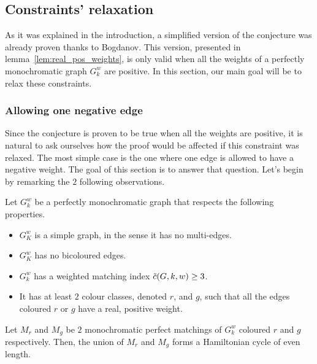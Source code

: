 \subsection{Constraints' relaxation}
\label{subsec:constraints_relaxation}

As it was explained in the introduction, a simplified version of the conjecture was already proven thanks to Bogdanov.\cite{bogdanov}
This version, presented in lemma~\ref{lem:real_pos_weights}, is only valid when all the weights of a perfectly monochromatic graph $G_k^w$ are positive.
In this section, our main goal will be to relax these constraints.

\subsubsection{Allowing one negative edge}
\label{subsubsec:one_negative_edge}

Since the conjecture is proven to be true when all the weights are positive, it is natural to ask ourselves how the proof would be affected if this constraint was relaxed.
The most simple case is the one where one edge is allowed to have a negative weight.
The goal of this section is to answer that question.
Let's begin by remarking the $2$ following observations.

\begin{observation}
    \label{obs:2_positive_classes_ham_cycle}
    Let $G_k^w$ be a perfectly monochromatic graph that respects the following properties.
    \begin{itemize}
        \item $G_K^w$ is a simple graph, in the sense it has no multi-edges.
        \item $G_K^w$ has no bicoloured edges.
        \item $G_k^w$ has a weighted matching index $\Tilde{c}(G, k, w) \geq 3$.
        \item It has at least $2$ colour classes, denoted $r$, and $g$, such that all the edges coloured $r$ or $g$ have a real, positive weight.
    \end{itemize}

    Let $M_r$ and $M_g$ be $2$ monochromatic perfect matchings of $G_k^w$ coloured $r$ and $g$ respectively.
    Then, the union of $M_r$ and $M_g$ forms a Hamiltonian cycle of even length.
\end{observation}


